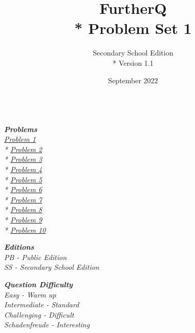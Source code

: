 
\title{FurtherQ \\* Problem Set 1}
\author{Secondary School Edition \\* Version 1.1}
\date{September 2022}




\maketitle
{
\small
\textit{
  \textbf{\\\Large{Problems}}\\
  \large
  \hyperlink{P1}{Problem 1} \\*
  \hyperlink{P2}{Problem 2} \\*
  \hyperlink{P3}{Problem 3} \\*
  \hyperlink{P4}{Problem 4} \\*
  \hyperlink{P5}{Problem 5} \\*
  \hyperlink{P6}{Problem 6} \\*
  \hyperlink{P7}{Problem 7} \\*
  \hyperlink{P8}{Problem 8} \\*
  \hyperlink{P9}{Problem 9} \\*
  \hyperlink{P10}{Problem 10} \\
}
  \begin{multicols*}{2}
    \textit{\textbf{\Large{Editions}} \\
            \large
            \hspace*{12pt} PB - Public Edition \\
            \hspace*{12pt} SS - Secondary School Edition \\
    }

  \textit{\textbf{\Large{Question Difficulty}} \\
          \large
          \hspace*{12pt} Easy - Warm up \\
          \hspace*{12pt} Intermediate - Standard \\
          \hspace*{12pt} Challenging - Difficult \\
          \hspace*{12pt} Schadenfreude - Interesting
  }


\end{multicols*}}

